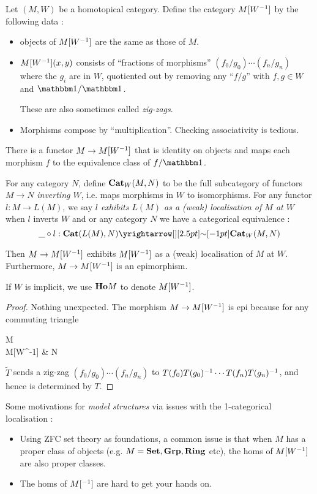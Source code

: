 \documentclass[./main.tex]{subfiles}
\begin{document}
\begin{prop}

  Let $(M , W)$ be a homotopical category.
  Define the category $M[W ^{-1}]$ by the following data : 
  \begin{itemize}
    \item objects of $M[W ^{-1}]$ are the same as those of $M$.
    \item $M[W ^{-1}](x,y)$ consists of ``fractions of morphisms'' 
    $(f_0 / g_0) \cdots (f_n / g_n)$ where the $g_i$ are in $W$,
    quotiented out by removing any ``$f / g$'' with $f , g \in W$
    and $\id{} / \id{}$.

    These are also sometimes called \emph{zig-zags}.
    \item Morphisms compose by ``multiplication''.
    Checking associativity is tedious.
  \end{itemize}
  There is a functor $M \to M[W^{-1}]$
  that is identity on objects and 
  maps each morphism $f$ to the equivalence class of $f / \id{}$.

  For any category $N$,
  define $\mathbf{Cat}_W (M , N)$ to be the full subcategory 
  of functors $M \to N$ \emph{inverting $W$},
  i.e. maps morphisms in $W$ to isomorphisms.
  For any functor $l : M \to L(M)$,
  we say \emph{$l$ exhibits $L(M)$ as a (weak) localisation of $M$ at $W$}
  when $l$ inverts $W$ and or any category $N$ we have
  a categorical equivalence : 
  \[
    \_ \circ l : \CAT(L(M) , N) \map{\sim}{} \CAT_W (M , N)
  \]

  Then $M \to M[W^{-1}]$ exhibits $M[W^{-1}]$ as 
  a (weak) localisation of $M$ at $W$.
  Furthermore, $M \to M[W^{-1}]$ is an epimorphism.

  If $W$ is implicit, we use $\mathbf{Ho} M$ to denote $M[W^{-1}]$.
\end{prop}
\begin{proof}
  Nothing unexpected.
  The morphism $M \to M[W^{-1}]$ is epi because
  for any commuting triangle 
  \begin{cd}
    M \\
    {M[W^{-1}]} & N
    \arrow[from=1-1, to=2-1]
    \arrow["T", from=1-1, to=2-2]
    \arrow["{\tilde{T}}"', from=2-1, to=2-2]
  \end{cd}
  $\tilde{T}$ sends a zig-zag $(f_0/g_0)\cdots (f_n/g_n)$
  to $T(f_0)T(g_0)^{-1} \cdots T(f_n)T(g_n)^{-1}$,
  and hence is determined by $T$.
\end{proof}

\begin{rmk}

  Some motivations for \emph{model structures} via
  issues with the 1-categorical localisation : 
  \begin{itemize}
    \item Using ZFC set theory as foundations,
    a common issue is that when $M$ has a proper class of objects 
    (e.g. $M = \mathbf{Set} , \mathbf{Grp} , \mathbf{Ring}$ etc),
    the homs of $M[W^{-1}]$ are also proper classes.
    \item The homs of $M[^{-1}]$ are hard to get your hands on.
  \end{itemize}
\end{rmk}
\end{document}
